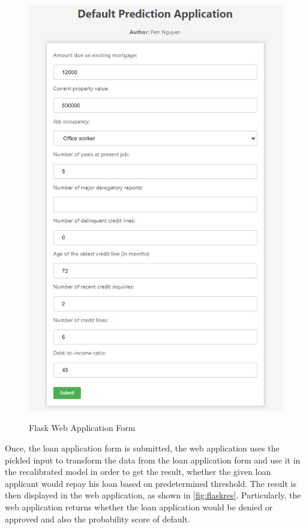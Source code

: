 \begin{figure}[H]
\centering
\caption{Flask Web Application Form}\vspace{0.5em}
\label{fig:flaskform}\
\includegraphics[width=140mm]{Figures/flask_app_form.jpg}

\vspace{-1em}
\end{figure}
\clearpage

Once, the loan application form is submitted, the web application uses the pickled input to transform the data from the loan application form and use it in the recalibrated model in order to get the result, whether the given loan applicant would repay his loan based on predetermined threshold. The result is then displayed in the web application, as shown in \autoref{fig:flaskres}.
Particularly, the web application returns whether the loan application would be denied or approved and also the probability score of default.

